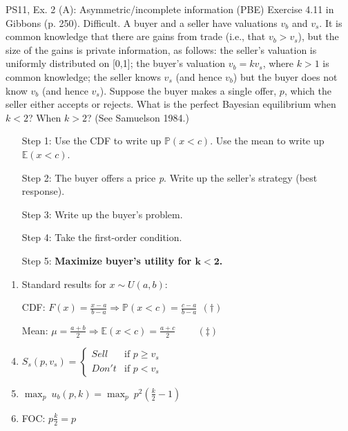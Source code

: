 \begin{frame}{PS11, Ex. 2 (A): Asymmetric/incomplete information (PBE)}
    Exercise 4.11 in Gibbons (p. 250). Difficult. A buyer and a seller have valuations $v_b$ and $v_s$. It is common knowledge that there are gains from trade (i.e., that $v_b > v_s$), but the size of the gains is private information, as follows: the seller’s valuation is uniformly distributed on [0,1]; the buyer’s valuation $v_b = kv_s$, where $k > 1$ is common knowledge; the seller knows $v_s$ (and hence $v_b$) but the buyer does not know $v_b$ (and hence $v_s$). Suppose the buyer makes a single offer, $p$, which the seller either accepts or rejects. What is the perfect Bayesian equilibrium when $k < 2$? When $k > 2$? (See Samuelson 1984.) \vspace{-8pt}
    \begin{multicols}{2}
      \begin{itemize}
        \item[Step 1:] Use the CDF to write up $\mathbb{P}(x<c)$. Use the mean to write up $\mathbb{E}(x<c)$.
        \item[Step 2:] The buyer offers a price \textit{p}. Write up the seller's strategy (best response).
        \item[Step 3:] Write up the buyer's problem.
        \item[Step 4:] Take the first-order condition.
        \item[Step 5:] \textbf{Maximize buyer's utility for $\bm{k<2}$.}
      \end{itemize}
      \vfill\null\columnbreak
      \begin{enumerate}
        \item Standard results for $x\sim U(a, b):$
        \item[CDF:] $F(x)=\frac{x-a}{b-a}\Rightarrow\mathbb{P}(x<c)=\frac{c-a}{b-a}\ \ (\dagger)$
        \item[Mean:] $\mu=\frac{a+b}{2}\Rightarrow\mathbb{E}(x<c)=\frac{a+c}{2}\quad\quad\ (\ddagger)$
        \item $S_s(p,v_s)=\left\{\begin{array}{ll}
          Sell  & \text{if }p\geq v_s \\
          Don't & \text{if }p < v_s
        \end{array}\right.$
        \item $\displaystyle{\max_p}\ u_b(p,k)=\displaystyle{\max_p}\ p^2\left(\frac{k}{2}-1\right)$
        \item FOC: $p\frac{k}{2}=p$
      \end{enumerate}
      \vfill\null
    \end{multicols}
\end{frame}
